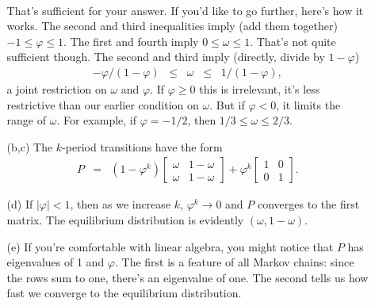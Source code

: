 \documentclass[11pt]{article}
\begin{document}
\begin{enumerate}
\begin{enumerate}
\begin{eqnarray*}
\end{eqnarray*}
That's sufficient for your answer.
If you'd like to go further, here's how it works.
The second and third inequalities imply (add them together)
$ - 1 \leq \varphi \leq 1 $.
The first and fourth imply $ 0 \leq \omega \leq 1$.
That's not quite sufficient though.
The second and third imply (directly, divide by $1-\varphi$)
\begin{eqnarray*}
        - \varphi /(1-\varphi) \;\;\leq\;\; \omega \;\;\leq\;\; 1/(1-\varphi),
\end{eqnarray*}
a joint restriction on $\omega$ and $\varphi$.
If $\varphi \geq 0$ this is irrelevant,
it's less restrictive than our earlier condition on $\omega$.
But if $\varphi < 0$, it limits the range of $\omega$.
For example, if $\varphi = -1/2$,
then $ 1/3 \leq \omega \leq 2/3$.

\item [(b,c)] The $k$-period transitions have the form
\begin{eqnarray*}
    P &=& (1-\varphi^k)
        \left[
        \begin{array}{cc}
        \omega & 1-\omega \\ \omega & 1-\omega
        \end{array}
        \right]
        + \varphi^k
        \left[
        \begin{array}{cc}
        1  & 0  \\  0  & 1
        \end{array}
        \right] .
\end{eqnarray*}

\item [(d)]
If $ | \varphi | < 1$,
then as we increase $k$, $\varphi^k \rightarrow 0$ and $P$ converges to the
first matrix.
The equilibrium distribution is evidently $(\omega, 1-\omega)$.

\item [(e)]
If you're comfortable with linear algebra, you might notice that
$P$ has eigenvalues of 1 and $\varphi$.
The first is a feature of all Markov chains:
since the rows sum to one, there's an eigenvalue of one.
The second tells us how fast we converge to the equilibrium
distribution.
\end{enumerate}


\end{enumerate}
\end{document}
